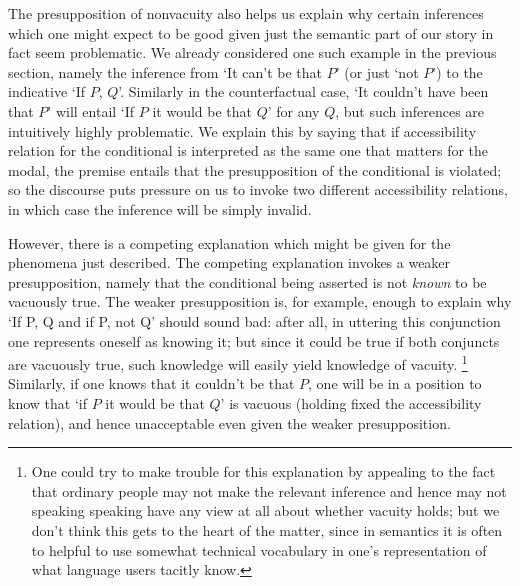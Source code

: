 \documentclass[If.tex]{subfiles}
\begin{document}
\begin{prop}
The presupposition of nonvacuity also helps us explain why certain inferences which one might expect to be good given just the semantic part of our story in fact seem problematic. We already considered one such example in the previous section, namely the inference from ‘It can't be that $P$’ (or just ‘not $P$’) to the indicative ‘If $P$, $Q$’. Similarly in the counterfactual case, ‘It couldn't have been that $P$’ will entail ‘If $P$ it would be that $Q$’ for any $Q$, but such inferences are intuitively highly problematic.  We explain this by saying that if accessibility relation for the conditional is interpreted as the same one that matters for the modal, the premise entails that the presupposition of the conditional is violated; so the discourse puts pressure on us to invoke two different accessibility relations, in which case the inference will be simply invalid.

However, there is a competing explanation which might be given for the phenomena just described. The competing explanation invokes a weaker presupposition, namely that the conditional being asserted is not \emph{known} to be vacuously true. The weaker presupposition is, for example, enough to explain why ‘If P, Q and if P, not Q’ should sound bad: after all, in uttering this conjunction one represents oneself as knowing it; but since it could be true if both conjuncts are vacuously true, such knowledge will easily yield knowledge of vacuity.%
\footnote{One could try to make trouble for this explanation by appealing to the fact that ordinary people may not make the relevant inference and hence may not speaking speaking have any view at all about whether vacuity holds; but we don't think this gets to the heart of the matter, since in semantics it is often to helpful to use somewhat technical vocabulary in one's representation of what language users tacitly know.}
 Similarly, if one knows that it couldn't be that $P$, one will be in a position to know that ‘if $P$ it would be that $Q$’ is vacuous (holding fixed the accessibility relation), and hence unacceptable even given the weaker presupposition.



\end{prop}
\end{document}
